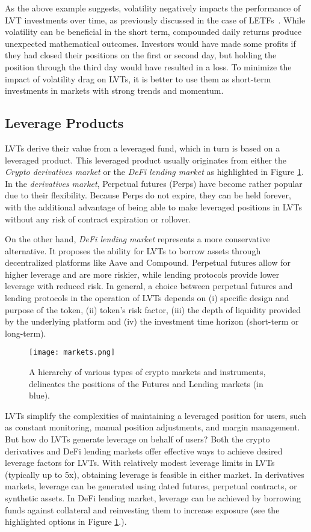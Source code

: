 As the above example suggests, volatility negatively impacts the performance of LVT investments over time, as previously discussed in the case of LETFs~\cite{giese2010performance, trainor2011daily}. While volatility can be beneficial in the short term, compounded daily returns produce unexpected mathematical outcomes. Investors would have made some profits if they had closed their positions on the first or second day, but holding the position through the third day would have resulted in a loss. To minimize the impact of volatility drag on LVTs, it is better to use them as short-term investments in markets with strong trends and momentum.

\subsection{Leverage Products}
LVTs derive their value from a leveraged fund, which in turn is based on a leveraged product. This leveraged product usually originates from either the \textit{Crypto derivatives market} or the \textit{DeFi lending market} as highlighted in Figure \ref{fig:markets}. In the \textit{derivatives market}, Perpetual futures (Perps) have become rather popular due to their flexibility. Because Perps do not expire, they can be held forever, with the additional advantage of being able to make leveraged positions in LVTs without any risk of contract expiration or rollover.

On the other hand, \textit{DeFi lending market} represents a more conservative alternative. It proposes the ability for LVTs to borrow assets through decentralized platforms like Aave and Compound. Perpetual futures allow for higher leverage and are more riskier, while lending protocols provide lower leverage with reduced risk. In general, a choice between perpetual futures and lending protocols in the operation of LVTs depends on (i) specific design and purpose of the token, (ii) token's risk factor, (iii) the depth of liquidity provided by the underlying platform and (iv) the investment time horizon (short-term or long-term).

\begin{figure}[t]
	\texttt{[image: markets.png]}
	\caption{A hierarchy of various types of crypto markets and instruments, delineates the positions of the Futures and Lending markets (in blue).}
	\label{fig:markets}
\end{figure}

LVTs simplify the complexities of maintaining a leveraged position for users, such as constant monitoring, manual position adjustments, and margin management. But how do LVTs generate leverage on behalf of users? Both the crypto derivatives and DeFi lending markets offer effective ways to achieve desired leverage factors for LVTs. With relatively modest leverage limits in LVTs (typically up to 5x), obtaining leverage is feasible in either market. In derivatives markets, leverage can be generated using dated futures, perpetual contracts, or synthetic assets. In DeFi lending market, leverage can be achieved by borrowing funds against collateral and reinvesting them to increase exposure (see the highlighted options in Figure \ref{fig:markets}.). 

